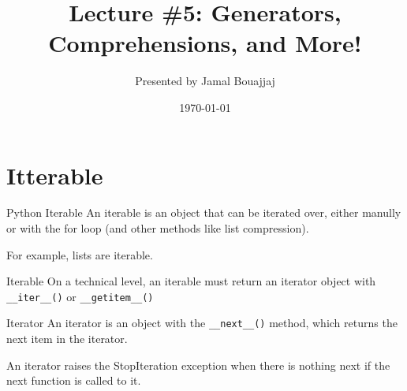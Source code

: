 %
%



\title{Lecture \#5: Generators, Comprehensions, and More!}
\date{\today}
\author{Presented by Jamal Bouajjaj}

\makeatletter
{}%
\makeatother



\maketitle

\section{Itterable}

\begin{frame}{Python Iterable}
  An iterable is an object that can be iterated over, either manully or with the for loop (and other methods like list compression).

  For example, lists are iterable.
\end{frame}

\begin{frame}[containsverbatim]{Iterable}
  On a technical level, an iterable must return an iterator object with \texttt{__iter__()} or \texttt{__getitem__()}
\end{frame}

\begin{frame}[containsverbatim]{Iterator}
  An iterator is an object with the \texttt{__next__()} method, which returns the next item in the iterator.

  An iterator raises the StopIteration exception when there is nothing next if the next function is called to it.
\end{frame}

